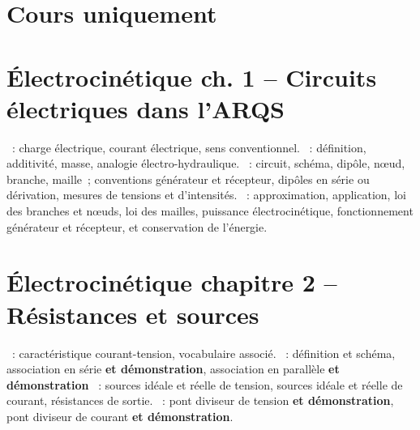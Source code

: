 \documentclass[a4paper, 12pt, final, garamond]{book}
\begin{document}
\section{Cours uniquement}

\section*{Électrocinétique ch. 1 -- Circuits électriques dans l'ARQS}
\begin{enumerate}[label=\Roman*]
	~: charge électrique, courant
	électrique, sens conventionnel.
	~: définition, additivité, masse, analogie
	électro-hydraulique.
	~: circuit, schéma,
	dipôle, nœud, branche, maille~; conventions générateur et récepteur,
	dipôles en série ou dérivation, mesures de tensions et d'intensités.
	~:
	approximation, application, loi des branches et nœuds, loi des mailles,
	puissance électrocinétique, fonctionnement générateur et récepteur, et
	conservation de l'énergie.
\end{enumerate}

\section*{Électrocinétique chapitre 2 -- Résistances et sources}
\begin{enumerate}[label=\Roman*]
	~: caractéristique courant-tension,
	vocabulaire associé.
	~: définition et schéma, association en série
	\textbf{et démonstration}, association en parallèle \textbf{et
		démonstration}
	~: sources idéale et réelle de tension, sources idéale
	et réelle de courant, résistances de sortie.
	~: pont diviseur de tension \textbf{et
		démonstration}, pont diviseur de courant \textbf{et démonstration}.
\end{enumerate}
\end{document}
